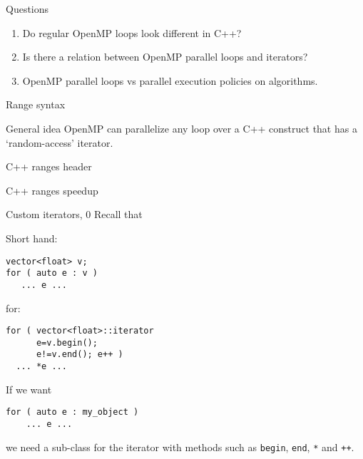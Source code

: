 \documentclass[11pt,headernav]{beamer}
\begin{document}

\begin{numberedframe}{Questions}
  \begin{enumerate}
  \item Do regular OpenMP loops look different in C++?
  \item Is there a relation between OpenMP parallel loops and iterators?
  \item OpenMP parallel loops vs parallel execution policies on algorithms.
  \end{enumerate}
\end{numberedframe}

\begin{numberedframe}{Range syntax}
  
\end{numberedframe}

\begin{numberedframe}{General idea}
  OpenMP can parallelize any loop over a C++ construct
  that has a `random-access' iterator.
\end{numberedframe}

\begin{numberedframe}{C++ ranges header}
  
\end{numberedframe}

\begin{numberedframe}{C++ ranges speedup}
  
\end{numberedframe}

\begin{numberedframe}{Custom iterators, 0}
  Recall that
\begin{multicols}{2}
Short hand:
\begin{lstlisting}
vector<float> v;
for ( auto e : v )
   ... e ...
\end{lstlisting}
\columnbreak for:
\begin{lstlisting}
for ( vector<float>::iterator 
      e=v.begin();
      e!=v.end(); e++ )
  ... *e ...
\end{lstlisting}
\end{multicols}
If we want 
\begin{lstlisting}
for ( auto e : my_object )
    ... e ...
\end{lstlisting}
we need a sub-class for the iterator with methods such as
\lstinline{begin}, \lstinline{end},
  \lstinline|*| and \lstinline|++|.
\end{numberedframe}
\end{document}
